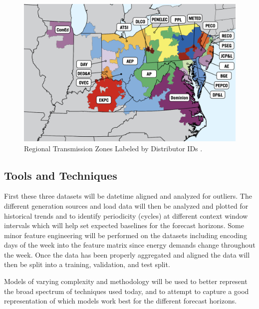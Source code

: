 \documentclass[sigconf]{acmart}
\begin{document}
  \begin{figure}
    \includegraphics[width=\columnwidth]{Images/Zones.png}
    \caption{Regional Transmission Zones Labeled by Distributor IDs \protect \cite{PJM24}.}
    \Description{}
    \label{fig:zone}
  \end{figure}

  \subsection{Tools and Techniques}
  First these three datasets will be datetime aligned and analyzed for outliers. The different generation sources and load data will then be analyzed and plotted for historical trends and to identify periodicity (cycles) at different context window intervals which will help set expected baselines for the forecast horizons. Some minor feature engineering will be performed on the datasets including encoding days of the week into the feature matrix since energy demands change throughout the week. Once the data has been properly aggregated and aligned the data will then be split into a training, validation, and test split.

Models of varying complexity and methodology will be used to better represent the broad spectrum of techniques used today, and to attempt to capture a good representation of which models work best for the different forecast horizons. 
\end{document}
